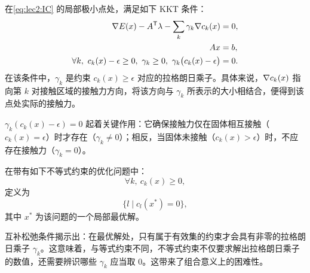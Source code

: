 在\cref{eq:lec2:IC} 的局部极小点处，满足如下 KKT 条件：
\begin{equation}
  \label{eq:lec2:IC_KKT}
  \begin{aligned}
    \nabla E(x) - A^{\mathsf{T}} \lambda - \sum_k \gamma_k \nabla c_k(x) &= 0, \\
    Ax &= b, \\
    \forall k,\ c_k(x) - \epsilon \ge 0,\ \gamma_k \ge 0,\ \gamma_k \bigl(c_k(x) - \epsilon\bigr) &= 0.
  \end{aligned}
\end{equation}
在该条件中，$\gamma_k$ 是约束 $c_k(x) \ge \epsilon$ 对应的拉格朗日乘子。具体来说，$\nabla c_k(x)$ 指向第 $k$ 对接触区域的接触力方向，将该方向与 $\gamma_k$ 所表示的大小相结合，便得到该点处实际的接触力。

\begin{remark}[互补松弛条件]
  \label{rem:lec2:complementarity_slack}
   $\gamma_k (c_k(x) - \epsilon) = 0$ 起着关键作用：它确保接触力仅在固体相互接触（$c_k(x) = \epsilon$）时才存在（$\gamma_k \neq 0$）；相反，当固体未接触（$c_k(x) > \epsilon$）时，不应存在接触力（$\gamma_k = 0$）。
\end{remark}

\begin{definition}[有效集]
  \label{def:lec2:active_set}
  在带有如下不等式约束的优化问题中：
  \[
    \forall k,\ c_k(x) \ge 0,
  \]
  定义为
  \[
    \{ l \mid c_l(x^*) = 0 \},
  \]
  其中 $x^*$ 为该问题的一个局部最优解。
\end{definition}

\begin{remark}[组合困难性]
  \label{rem:lec2:comb_diffcult}
  互补松弛条件揭示出：在最优解处，只有属于有效集的约束才会具有非零的拉格朗日乘子 $\gamma_k$。这意味着，与等式约束不同，不等式约束不仅要求解出拉格朗日乘子的数值，还需要辨识哪些 $\gamma_k$ 应当取 $0$。这带来了组合意义上的困难性。
\end{remark}

